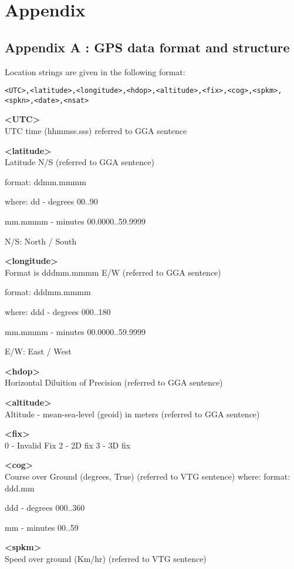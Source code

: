
\chapter{Appendix}
\section{Appendix A : GPS data format and structure}
Location strings are given in the following format:
\begin{lstlisting}
<UTC>,<latitude>,<longitude>,<hdop>,<altitude>,<fix>,<cog>,<spkm>,<spkn>,<date>,<nsat>
\end{lstlisting}

\textbf{<UTC>} \\
UTC time (hhmmss.sss) referred to GGA sentence

\textbf{<latitude>} \\
Latitude N/S (referred to GGA sentence)
	
format:
ddmm.mmmm
					
where:
dd - degrees
00..90

mm.mmmm - minutes
00.0000..59.9999

N/S: North / South 

\textbf{<longitude>} \\
Format is dddmm.mmmm E/W (referred to GGA sentence) 

format:
dddmm.mmmm

where:
ddd - degrees						
000..180

mm.mmmm - minutes				
00.0000..59.9999

E/W: East / West

\textbf{<hdop>} \\
Horizontal Diluition of Precision (referred to GGA sentence) 

\textbf{<altitude>} \\
Altitude - mean-sea-level (geoid) in meters (referred to GGA sentence)

\textbf{<fix>} \\
0 - Invalid Fix
2 - 2D fix
3 - 3D fix

\textbf{<cog>} \\
Course over Ground (degrees, True) (referred to VTG sentence) where:
format:
ddd.mm

ddd - degrees		 	 	 		
000..360

mm - minutes						
00..59


\textbf{<spkm>}\\
Speed over ground (Km/hr) (referred to VTG sentence)

